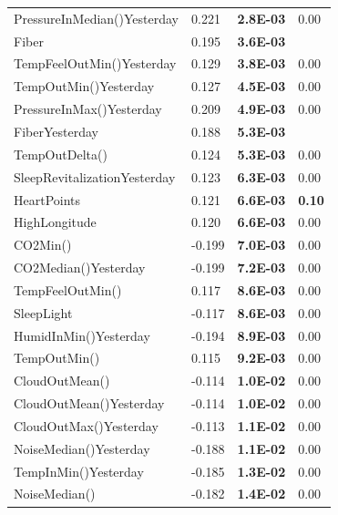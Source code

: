 \documentclass[conference]{IEEEtran}
\begin{document}
\begin{table}[]
\begin{tabular}{llll}
PressureInMedian()Yesterday    & 0.221  & \textbf{2.8E-03} & 0.00           \\
Fiber                          & 0.195  & \textbf{3.6E-03} &                \\
TempFeelOutMin()Yesterday      & 0.129  & \textbf{3.8E-03} & 0.00           \\
TempOutMin()Yesterday          & 0.127  & \textbf{4.5E-03} & 0.00           \\
PressureInMax()Yesterday       & 0.209  & \textbf{4.9E-03} & 0.00           \\
FiberYesterday                 & 0.188  & \textbf{5.3E-03} &                \\
TempOutDelta()                 & 0.124  & \textbf{5.3E-03} & 0.00           \\
SleepRevitalizationYesterday   & 0.123  & \textbf{6.3E-03} & 0.00           \\
HeartPoints                    & 0.121  & \textbf{6.6E-03} & \textbf{0.10}  \\
HighLongitude                  & 0.120  & \textbf{6.6E-03} & 0.00           \\
CO2Min()                       & -0.199 & \textbf{7.0E-03} & 0.00           \\
CO2Median()Yesterday           & -0.199 & \textbf{7.2E-03} & 0.00           \\
TempFeelOutMin()               & 0.117  & \textbf{8.6E-03} & 0.00           \\
SleepLight                     & -0.117 & \textbf{8.6E-03} & 0.00           \\
HumidInMin()Yesterday          & -0.194 & \textbf{8.9E-03} & 0.00           \\
TempOutMin()                   & 0.115  & \textbf{9.2E-03} & 0.00           \\
CloudOutMean()                 & -0.114 & \textbf{1.0E-02} & 0.00           \\
CloudOutMean()Yesterday        & -0.114 & \textbf{1.0E-02} & 0.00           \\
CloudOutMax()Yesterday         & -0.113 & \textbf{1.1E-02} & 0.00           \\
NoiseMedian()Yesterday         & -0.188 & \textbf{1.1E-02} & 0.00           \\
TempInMin()Yesterday           & -0.185 & \textbf{1.3E-02} & 0.00           \\
NoiseMedian()                  & -0.182 & \textbf{1.4E-02} & 0.00           \\

\end{tabular}
\end{table}
\end{document}
